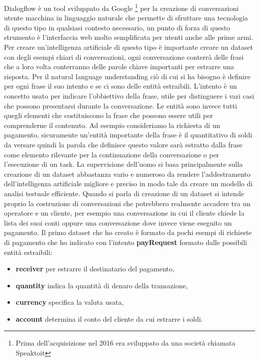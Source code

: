 Dialogflow è un tool sviluppato da Google \footnote{Prima dell'acquisizione nel 2016 era sviluppato da una società chiamata Speaktoit} per la creazione di conversazioni utente macchina in linguaggio naturale che permette di sfruttare una tecnologia di questo tipo in qualsiasi contesto necessario, un punto di forza di questo strumento è l'interfaccia web molto semplificata per utenti anche alle prime armi.
Per creare un'intelligenza artificiale di questo tipo è importante creare un dataset con degli esempi chiari di conversazioni, ogni conversazione conterrà delle frasi che a loro volta conterranno delle parole chiave importanti per estrarre una risposta. Per il natural language understanding ciò di cui si ha bisogno è definire per ogni frase il suo intento e se ci sono delle entità estraibili. 
L'intento è un concetto usato per indicare l'obbiettivo della frase, utile per distinguere i vari casi che possono presentarsi durante la conversazione. 
Le entità sono invece tutti quegli elementi che costituiscono la frase che possono essere utili per comprenderne il contenuto. Ad esempio consideriamo la richiesta di un pagamento, sicuramente un'entità importante della frase è il quantitativo di soldi da versare quindi la parola che definisce questo valore sarà estratto dalla frase come elemento rilevante per la continuazione della conversazione o per l'esecuzione di un task.
La supervisione dell'uomo si basa principalmente sulla creazione di un dataset abbastanza vario e numeroso da rendere l'addestramento dell'intelligenza artificiale migliore e preciso in modo tale da creare un modello di analisi testuale efficiente. Quando si parla di creazione di un dataset si intende proprio la costruzione di conversazioni che potrebbero realmente accadere tra un operatore e un cliente, per esempio una conversazione in cui il cliente chiede la lista dei suoi conti oppure una conversazione dove invece viene eseguito un pagamento.
Il primo dataset che ho creato è formato da pochi esempi di richieste di pagamento che ho indicato con l'intento \textbf{payRequest} formato dalle possibili entità estraibili:
\begin{itemize}
\item \textbf{receiver} per estrarre il destinatario del pagamento,
\item \textbf{quantity} indica la quantità di denaro della transazione, 
\item \textbf{currency} specifica la valuta usata,
\item \textbf{account} determina il conto del cliente da cui estrarre i soldi.
\end{itemize}
